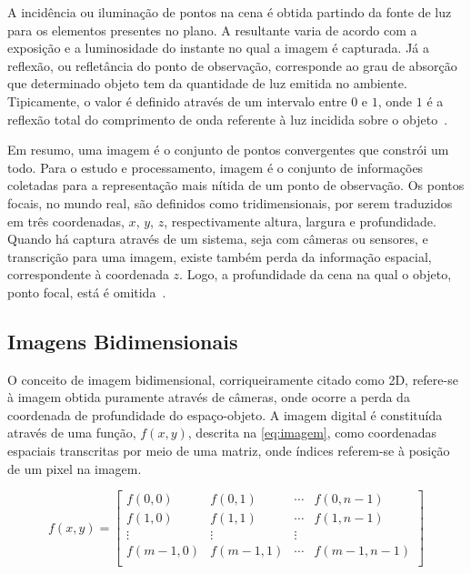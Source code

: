 \documentclass[12pt,oneside,a4paper,chapter=TITLE,section=TITLE,sumario=tradicional]{abntex2}
\begin{document}
\begin{figure}[htb]
\end{figure}

A incidência ou iluminação de pontos na cena é obtida partindo da fonte de luz para os elementos presentes no plano. A resultante varia de acordo com a exposição e a luminosidade do instante no qual a imagem é capturada. Já a reflexão, ou refletância do ponto de observação, corresponde ao grau de absorção que determinado objeto tem da quantidade de luz emitida no ambiente. Tipicamente, o valor é definido através de um intervalo entre $0$ e $1$, onde $1$ é a reflexão total do comprimento de onda referente à luz incidida sobre o objeto~\cite{pdi2006}.

Em resumo, uma imagem é o conjunto de pontos convergentes que constrói um todo. Para o estudo e processamento, imagem é o conjunto de informações coletadas para a representação mais nítida de um ponto de observação. Os pontos focais, no mundo real, são definidos como tridimensionais, por serem traduzidos em três coordenadas, $x$, $y$, $z$, respectivamente altura, largura e profundidade. Quando há captura através de um sistema, seja com câmeras ou sensores, e transcrição para uma imagem, existe também perda da informação espacial, correspondente à coordenada $z$. Logo, a profundidade da cena na qual o objeto, ponto focal, está é omitida~\cite{pdi2006}.

\subsection{Imagens Bidimensionais}

O conceito de imagem bidimensional, corriqueiramente citado como 2D, refere-se à imagem obtida puramente através de câmeras, onde ocorre a perda da coordenada de profundidade do espaço-objeto. A imagem digital é constituída através de uma função, $f(x,y)$, descrita na \autoref{eq:imagem}, como coordenadas espaciais transcritas por meio de uma matriz, onde índices referem-se à posição de um pixel na imagem.

\begin{equation}
\label{eq:imagem}
f(x,y) = 
\begin{bmatrix}
f(0,0) & f(0,1) & \cdots & f(0, n-1)\\
f(1,0) & f(1,1) & \cdots & f(1, n-1) \\
\vdots & \vdots & \vdots & \\
f(m-1,0) & f(m-1, 1) & \cdots & f(m-1, n-1)\\
\end{bmatrix}
\end{equation}
\end{document}
